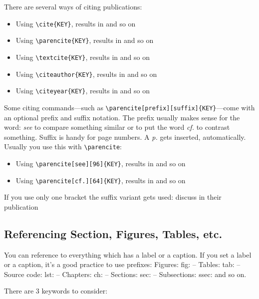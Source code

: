 There are several ways of citing publications:

\begin{itemize}
	\setlength\itemsep{-0.75em} %
	\item Using \verb|\cite{KEY}|, results in \cite{StaplesBieman1999} and so on 
	\item Using \verb|\parencite{KEY}|, results in \parencite{StaplesBieman1999} and so on 
	\item Using \verb|\textcite{KEY}|, results in \textcite{StaplesBieman1999} and so on 
	\item Using \verb|\citeauthor{KEY}|, results in \citeauthor{StaplesBieman1999} and so on 
	\item Using \verb|\citeyear{KEY}|, results in \citeyear{StaplesBieman1999} and so on 
\end{itemize}

Some citing commands---such as  \verb|\parencite[prefix][suffix]{KEY}|---come with an optional prefix and suffix notation. The prefix usually makes sense for the word: \textit{see} to compare something similar or to put the word \textit{cf.} to contrast something. Suffix is handy for page numbers. A \textit{p.} gets inserted, automatically. Usually you use this with \verb|\parencite|:

\begin{itemize}
	\setlength\itemsep{-0.75em} %
	\item Using \verb|\parencite[see][96]{KEY}|, results in \parencite[see][96]{StaplesBieman1999} and so on
	\item Using \verb|\parencite[cf.][64]{KEY}|, results in \parencite[cf.][64]{StaplesBieman1999} and so on 
\end{itemize}

If you use only one bracket the suffix variant gets used: \textcite[97]{StaplesBieman1999} discuss in their publication \textellipsis

\subsection{Referencing Section, Figures, Tables, etc.}

You can reference to everything which has a label or a caption. If you set a label or a caption, it’s a good practice to use prefixes: Figures: fig: -- Tables: tab: -- Source code: lst: -- Chapters: ch: -- Sections: sec: -- Subsections: ssec: and so on.

There are 3 keywords to consider:

